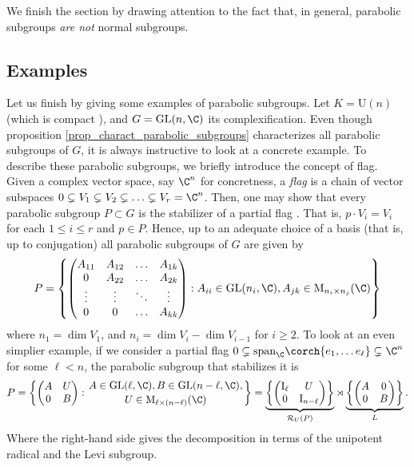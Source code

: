 We finish the section by drawing attention to the fact that, in general, parabolic subgroups \textit{are not} normal subgroups.

\subsection{Examples}
{\color{violet}
Let us finish by giving some examples of parabolic subgroups. Let \(K=\mathrm{U}(n)\) (which is compact \parencite[Lemma 2.1.4]{hilgert2011structure}), and \(G=\mathrm{GL}(n, \C)\) its complexification. Even though proposition \ref{prop_charact_parabolic_subgroups} characterizes all parabolic subgroups of \(G\), it is always instructive to look at a concrete example. To describe these parabolic subgroups, we briefly introduce the concept of flag. Given a complex vector space, say \(\C^n\) for concretness, a \textit{flag} is a chain of vector subspaces \(0 \subsetneq V_1 \subsetneq V_2 \subsetneq \ldots \subsetneq V_r=\C^n\). Then,  one may show that every parabolic subgroup \(P \subset G\) is the stabilizer of a partial flag \parencite[Sec. 21.3 Cor. B]{humphreys1975linear}. That is, \(p\cdot V_i=V_i\) for each \(1 \le i \leq r\) and \(p\in P\). Hence, up to an adequate choice of a basis (that is, up to conjugation) all parabolic subgroups of \(G\) are given by
\[
P=\left\lbrace
\begin{pmatrix}
    A_{11} & A_{12} & \ldots & A_{1k} \\
    0 & A_{22} & \ldots & A_{2k} \\
    \vdots & \vdots & \ddots & \vdots \\
    0 & 0 & \ldots & A_{kk} 
\end{pmatrix} :  A_{ii}\in \mathrm{GL}(n_i, \C), A_{jk} \in \mathrm{M}_{n_i \times n_j}(\C)
\right\rbrace
\]
where \(n_1=\dim V_1\), and \(n_i=\dim V_i-\dim V_{i-1}\) for \(i \geq 2\). To look at an even simplier example, if we consider a partial flag \(0\subsetneq \mathrm{span}_\C\corch{e_1,\ldots e_\ell} \subsetneq \C^n\) for some \(\ell <n\), the parabolic subgroup that stabilizes it is
\[
P=\left\lbrace 
\begin{pmatrix}
    A & U \\
    0 & B
\end{pmatrix} : {A \in \mathrm{GL}(\ell , \C), B\in \mathrm{GL}(n-\ell, \C), \atop U \in \mathrm{M}_{\ell \times (n-\ell)}(\C)}
\right\rbrace = \underbrace{\left\lbrace \begin{pmatrix}
    \mathrm{I}_\ell & U \\
    0 & \mathrm{I}_{n-\ell}
\end{pmatrix} \right\rbrace}_{\mathcal{R}_U(P)} \rtimes \underbrace{\left\lbrace \begin{pmatrix}
    A & 0 \\
    0 & B
\end{pmatrix} \right\rbrace }_L.
\]
Where the right-hand side gives the decomposition in terms of the unipotent radical and the Levi subgroup.
}

